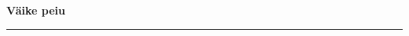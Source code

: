 \documentclass[10pt]{book}
\begin{document}
{
  \samepage
  \raggedbottom
  \raggedright
  \sloppy


  \vspace{0.2in}

  \noindent\begin{minipage}{.1\textwidth}
    \hfill\vspace{0.1in}
  \end{minipage}%
  \noindent\begin{minipage}{.8\textwidth}
    \centering
    \bfseries
    \large V\"aike peiu
  \end{minipage}%
  \noindent\begin{minipage}{.1\textwidth}
      \hfill\vspace{0.1in}
  \end{minipage}

  \nopagebreak[4]
  \vspace{0.1in}
  \nopagebreak[4]
  \hrule height 0.05ex
  \nopagebreak[4]
  \vspace{-0.05in}




}
\end{document}
